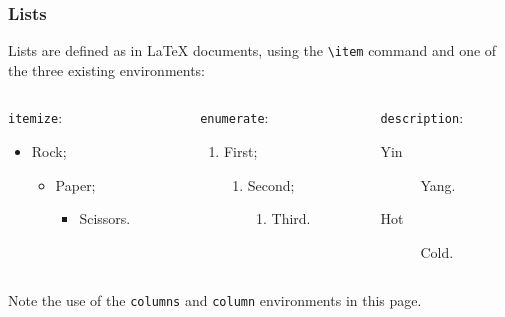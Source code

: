 \documentclass[10pt,    %
    english,            %
    xcolor=table,       %
    envcountsect,        %
    aspectratio=169     %
]{beamer}
\begin{document}
\begin{frame}
    \frametitle{Lists}
    
    Lists are defined as in \LaTeX{} documents, using the \texttt{\textbackslash{}item} command and one of the three existing environments:
    \begin{columns}[T,onlytextwidth]
        \begin{column}{0.33\textwidth}
            \texttt{itemize}:
            \begin{itemize}
                \item Rock;
                \begin{itemize}
                    \item Paper;
                    \begin{itemize}
                        \item Scissors.
                    \end{itemize}
                \end{itemize}
            \end{itemize}
        \end{column}
        \begin{column}{0.33\textwidth}
            \texttt{enumerate}:
            \begin{enumerate}
                \item First;
                \begin{enumerate}
                    \item Second;
                    \begin{enumerate}
                        \item Third.
                    \end{enumerate}
                \end{enumerate}
            \end{enumerate}
        \end{column}
        \begin{column}{0.33\textwidth}
            \texttt{description}:
            \begin{description}
                \item[Yin] Yang.
                \item[Hot] Cold.
            \end{description}
        \end{column}
    \end{columns}
    
    \vspace{0.25cm}
    Note the use of the \texttt{columns} and \texttt{column} environments in this page.
\end{frame}
\end{document}
